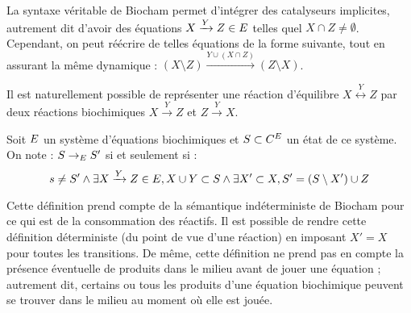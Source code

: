\begin{remark}
  La syntaxe véritable de Biocham permet d'intégrer des catalyseurs implicites,
  autrement dit d'avoir des équations $X \xrightarrow{Y} Z \in E$
  telles quel $X \cap Z \neq \emptyset$.
  Cependant, on peut réécrire de telles équations de la forme suivante,
  tout en assurant la même dynamique :
  $(X \setminus Z) \xrightarrow{Y \cup (X \cap Z)} (Z \setminus X)$.
\end{remark}

\begin{remark}
  Il est naturellement possible de représenter une réaction d'équilibre
  $X \overset{Y}{\longleftrightarrow} Z$ par deux réactions biochimiques
  $X \xrightarrow{Y} Z$ et $Z \xrightarrow{Y} X$.
\end{remark}

\begin{definition}
  Soit $E$ un système d'équations biochimiques
  et $S \subset C^{E}$ un état de ce système.
  On note : $S \rightarrow_{E} S'$ si et seulement si :
  \[s \neq S' \wedge
    \exists X \xrightarrow{Y} Z \in E,
    X \cup Y \subset S \wedge
    \exists X' \subset X, S' = (S \setminus X') \cup Z\]
\end{definition}

\begin{remark}
  Cette définition prend compte de la sémantique indéterministe de Biocham pour ce qui est
  de la consommation des réactifs.
  Il est possible de rendre cette définition déterministe (du point de vue d'une réaction)
  en imposant $X' = X$ pour toutes les transitions.
  De même, cette définition ne prend pas en compte la présence éventuelle de produits
  dans le milieu avant de jouer une équation ;
  autrement dit, certains ou tous les produits d'une équation biochimique
  peuvent se trouver dans le milieu au moment où elle est jouée.
\end{remark}

